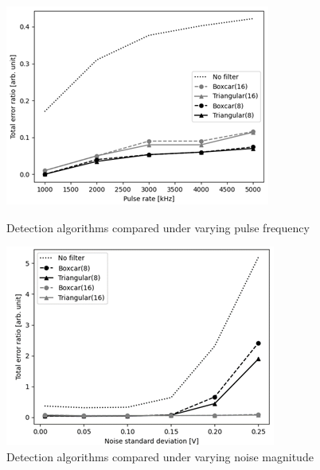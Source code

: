   \begin{figure}[H]
    \centering
    \begin{minipage}{.45\textwidth}
      \centering
      \includegraphics[width=\linewidth]{media/detection_sim_pulse_rate.png}
      \caption{Detection algorithms compared under varying pulse frequency}
      \label{fig:detection_sim_pulse_rate}
    \end{minipage}%
    \hfill
    \begin{minipage}{.45\textwidth}
      \centering
      \includegraphics[width=\linewidth]{media/detection_sim_noise.png}
      \caption{Detection algorithms compared under varying noise magnitude}
      \label{fig:detection_sim_noise}
    \end{minipage}
  \end{figure}